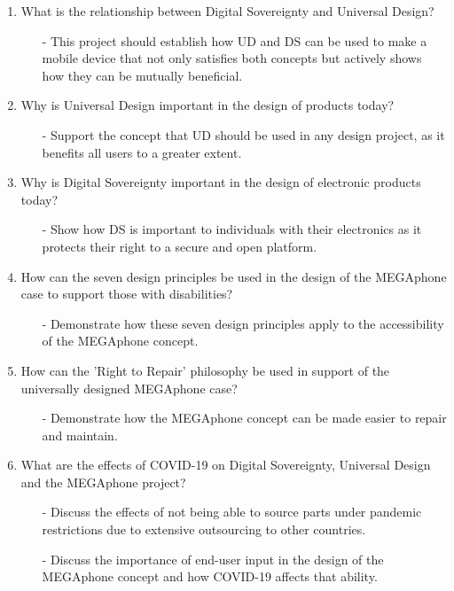 \begin{enumerate}
    \item What is the relationship between Digital Sovereignty and Universal Design?
        \begin{enumerate}
        \item[-] This project should establish how UD and DS can be used to make a mobile device that not only satisfies both concepts but actively shows how they can be mutually beneficial.
        \end{enumerate} 
    \item Why is Universal Design important in the design of products today?
        \begin{enumerate}
        \item[-] Support the concept that UD should be used in any design project, as it benefits all users to a greater extent.
        \end{enumerate}
    \item Why is Digital Sovereignty important in the design of electronic products today?
        \begin{enumerate}
        \item[-] Show how DS is important to individuals with their electronics as it protects their right to a secure and open platform.
        \end{enumerate} 
    \item How can the seven design principles be used in the design of the MEGAphone case to support those with disabilities?
        \begin{enumerate}
        \item[-] Demonstrate how these seven design principles apply to the accessibility of the MEGAphone concept.
        \end{enumerate} 
    \item How can the 'Right to Repair' philosophy be used in support of the universally designed MEGAphone case?
        \begin{enumerate}
        \item[-] Demonstrate how the MEGAphone concept can be made easier to repair and maintain.
        \end{enumerate} 
    \item What are the effects of COVID-19 on Digital Sovereignty, Universal Design and the MEGAphone project?
        \begin{enumerate}
        \item[-] Discuss the effects of not being able to source parts under pandemic restrictions due to extensive outsourcing to other countries.
        \item[-] Discuss the importance of end-user input in the design of the MEGAphone concept and how COVID-19 affects that ability.
        \end{enumerate} 
\end{enumerate}

